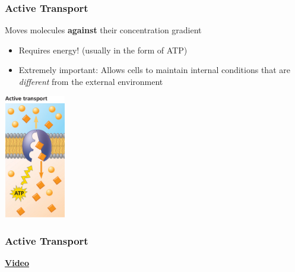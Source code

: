 \documentclass[10pt]{beamer}
\begin{document}
\begin{frame}[t]
\frametitle{Active Transport}
\vspace{0.5cm}

	Moves molecules \textbf{against} their concentration gradient
		\begin{itemize}
			\item Requires energy! (usually in the form of ATP)
			\item Extremely important: Allows cells to maintain internal conditions that are \emph{different} from the external environment
		\end{itemize}

	\begin{center}
		\includegraphics[width=0.20\textwidth]{figures/fg07_16b.jpg}
	\end{center}
\end{frame}


\begin{frame}
\frametitle{Active Transport}
\vspace{0.5cm}

	\begin{center}
		\href{https://www.youtube.com/watch?v=M6_NCdV7YO8}{\LARGE{\textbf{Video}}}
	\end{center}

\end{frame}
\end{document}
